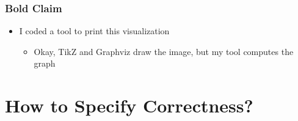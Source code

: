 \documentclass[aspectratio=169,t]{beamer}
\begin{document}
\begin{frame}
	\frametitle{Bold Claim}
	\vspace*{5ex}
	\begin{itemize}
		\item I coded a tool to print this visualization
		\begin{itemize}
			\item<2-> Okay, TikZ and Graphviz draw the image, but my tool computes the graph
		\end{itemize}
	\end{itemize}
\end{frame}


\section{How to Specify Correctness?}
\end{document}
